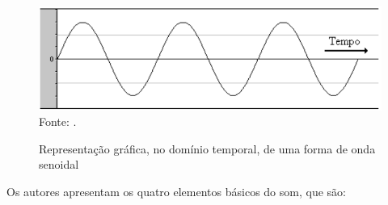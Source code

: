 \begin{figure}[!htb]
   \centering
   \caption{Representação gráfica, no domínio temporal, de uma forma de onda senoidal}\label{fig:ondaSenoidal} 
   \includegraphics[scale=0.4]{figuras/ondaSenoidal.png}
   Fonte: \cite{miletto2004}.
\end{figure}

Os autores  apresentam os quatro elementos básicos do som, que são:
